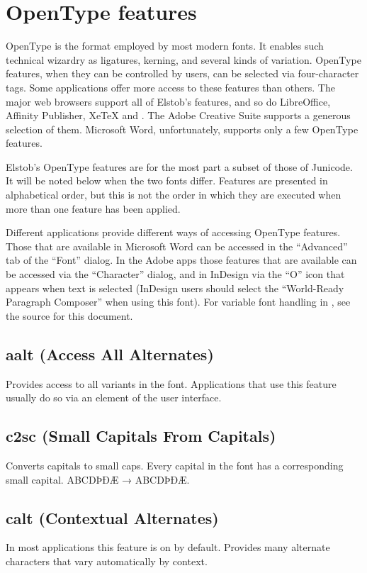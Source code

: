 \documentclass[12pt,letterpaper,openany]{book}
\begin{document}
\chapter{OpenType features}

OpenType is the format employed by most modern fonts. It enables such technical
wizardry as ligatures, kerning, and several kinds of variation. OpenType features,
when they can be controlled by users, can be selected via four-character tags.
Some applications offer more access to these features than others. The major web browsers
support all of Elstob’s features, and so do LibreOffice, Affinity Publisher,
XeTeX and {\ltech}. The Adobe Creative Suite supports a generous selection of
them. Microsoft Word, unfortunately, supports only a few OpenType features.

Elstob’s OpenType
features are for the most part a subset of those of Junicode. It will be noted
below when the two fonts differ. Features are presented in alphabetical order,
but this is not the order in which they are executed when more than one feature
has been applied.

Different applications provide different ways of accessing OpenType features.
Those that are available in Microsoft Word can be accessed in the “Advanced”
tab of the “Font” dialog. In the Adobe apps those features that are available
can be accessed via the “Character” dialog, and in InDesign via the “O” icon that
appears when text is selected (InDesign users should select the “World-Ready
Paragraph Composer” when using this font). For variable font handling in
{\ltech}, see the source for this document.

\section{aalt (Access All Alternates)}
Provides access to all variants in the font. Applications that use this feature
usually do so via an element of the user interface.

\section{c2sc (Small Capitals From Capitals)}
Converts capitals to small caps. Every capital in the font has a corresponding
small capital. ABCDÞÐÆ → { ABCDÞÐÆ}.

\section{calt (Contextual Alternates)}
In most applications this feature is on by default.
Provides many alternate characters that vary automatically by context.
\end{document}

